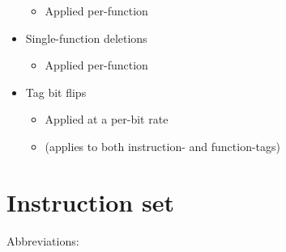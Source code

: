 \documentclass[
]{book}
\providecommand{\tightlist}{%
  \setlength{\itemsep}{0pt}\setlength{\parskip}{0pt}}
\begin{document}
\begin{itemize}
  \begin{itemize}
  \tightlist
  \item
    Applied per-function
  \end{itemize}
\item
  Single-function deletions

  \begin{itemize}
  \tightlist
  \item
    Applied per-function
  \end{itemize}
\item
  Tag bit flips

  \begin{itemize}
  \tightlist
  \item
    Applied at a per-bit rate
  \item
    (applies to both instruction- and function-tags)
  \end{itemize}
\end{itemize}

\hypertarget{instruction-set}{%
\section{Instruction set}\label{instruction-set}}

Abbreviations:
\end{document}
